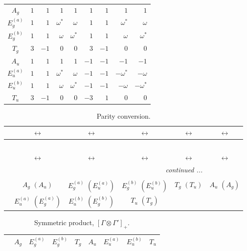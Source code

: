 \documentclass[fleqn,10pt,landscape]{article}
\begin{document}
\begin{itemize}
\begin{center}
\begin{longtable}{c|rrrrrrrr}
$ A_{g} $ & $ 1 $ & $ 1 $ & $ 1 $ & $ 1 $ & $ 1 $ & $ 1 $ & $ 1 $ & $ 1 $ \\
$ E_{g}^{(a)} $ & $ 1 $ & $ 1 $ & $ \omega^{*} $ & $ \omega $ & $ 1 $ & $ 1 $ & $ \omega^{*} $ & $ \omega $ \\
$ E_{g}^{(b)} $ & $ 1 $ & $ 1 $ & $ \omega $ & $ \omega^{*} $ & $ 1 $ & $ 1 $ & $ \omega $ & $ \omega^{*} $ \\
$ T_{g} $ & $ 3 $ & $ -1 $ & $ 0 $ & $ 0 $ & $ 3 $ & $ -1 $ & $ 0 $ & $ 0 $ \\
$ A_{u} $ & $ 1 $ & $ 1 $ & $ 1 $ & $ 1 $ & $ -1 $ & $ -1 $ & $ -1 $ & $ -1 $ \\
$ E_{u}^{(a)} $ & $ 1 $ & $ 1 $ & $ \omega^{*} $ & $ \omega $ & $ -1 $ & $ -1 $ & $ - \omega^{*} $ & $ - \omega $ \\
$ E_{u}^{(b)} $ & $ 1 $ & $ 1 $ & $ \omega $ & $ \omega^{*} $ & $ -1 $ & $ -1 $ & $ - \omega $ & $ - \omega^{*} $ \\
$ T_{u} $ & $ 3 $ & $ -1 $ & $ 0 $ & $ 0 $ & $ -3 $ & $ 1 $ & $ 0 $ & $ 0 $ \\
\end{longtable}
\end{center}
\begin{center}
\renewcommand{\arraystretch}{1.0}
\begin{longtable}{cccccc}
\caption{Parity conversion.}
 \\
 \hline \hline
 & $\leftrightarrow$ & $\leftrightarrow$ & $\leftrightarrow$ & $\leftrightarrow$ & $\leftrightarrow$ \\ \hline \endfirsthead

\multicolumn{5}{l}{\tablename\ \thetable{}} \\
 \hline \hline
 & $\leftrightarrow$ & $\leftrightarrow$ & $\leftrightarrow$ & $\leftrightarrow$ & $\leftrightarrow$ \\ \hline \endhead

 \hline \hline
\multicolumn{5}{r}{\footnotesize\it continued ...} \\ \endfoot

 \hline \hline
\multicolumn{5}{r}{} \\ \endlastfoot

 & $ A_{g}\,\,(A_{u}) $ & $ E_{g}^{(a)}\,\,(E_{u}^{(a)}) $ & $ E_{g}^{(b)}\,\,(E_{u}^{(b)}) $ & $ T_{g}\,\,(T_{u}) $ & $ A_{u}\,\,(A_{g}) $ \\
& $ E_{u}^{(a)}\,\,(E_{g}^{(a)}) $ & $ E_{u}^{(b)}\,\,(E_{g}^{(b)}) $ & $ T_{u}\,\,(T_{g}) $ & $  $ & $  $ \\
\end{longtable}
\end{center}
\begin{center}
\renewcommand{\arraystretch}{1.0}
\begin{longtable}{c|cccccccc}
\caption{Symmetric product, $[\Gamma\otimes\Gamma']_+.$}
 \\
 \hline \hline
 & $ A_{g} $ & $ E_{g}^{(a)} $ & $ E_{g}^{(b)} $ & $ T_{g} $ & $ A_{u} $ & $ E_{u}^{(a)} $ & $ E_{u}^{(b)} $ & $ T_{u} $ \\ \hline \endfirsthead


\end{longtable}
\end{center}
\end{itemize}
\end{document}
